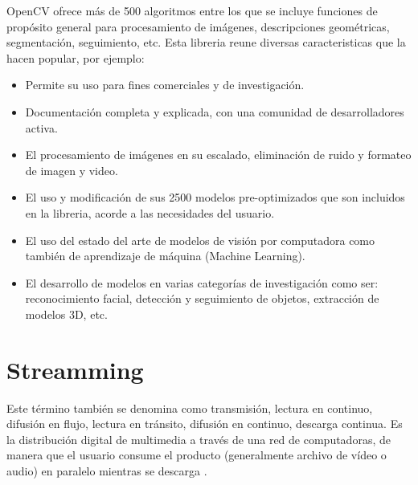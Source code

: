 OpenCV ofrece más de 500 algoritmos entre los que se incluye funciones de propósito general para procesamiento de imágenes, descripciones geométricas, segmentación, seguimiento, etc. Esta libreria reune diversas caracteristicas que la hacen popular, por ejemplo:\\

\begin{itemize}
    \item Permite su uso para fines comerciales y de investigación.
    \item Documentación completa y explicada, con una comunidad de desarrolladores activa.
    \item El procesamiento de imágenes en su escalado, eliminación de ruido y formateo de imagen y video.
    \item El uso y modificación de sus 2500 modelos pre-optimizados que son incluidos en la libreria, acorde a las necesidades del usuario.
    \item El uso del estado del arte de modelos de visión por computadora como también de aprendizaje de máquina (Machine Learning).
    \item El desarrollo de modelos en varias categorías de investigación como ser: reconocimiento facial, detección y seguimiento de objetos, extracción de modelos 3D, etc.
\end{itemize}



\section{Streamming}
Este término también se denomina como transmisión, lectura en continuo, difusión en flujo, lectura en tránsito, difusión en continuo, descarga continua. Es la distribución digital de multimedia a través de una red de computadoras, de manera que el usuario consume el producto (generalmente archivo de vídeo o audio) en paralelo mientras se descarga \cite{streamming:austerberry}.\\

